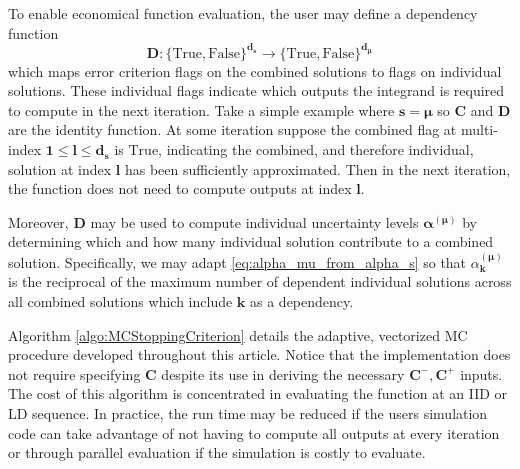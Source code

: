 \documentclass[graybox]{svmult}
\begin{document}
To enable economical function evaluation, the user may define a dependency function
$$\boldsymbol{D}: \{\text{True},\text{False}\}^{\boldsymbol{d}_{\boldsymbol{s}}} \to \{\text{True},\text{False}\}^{\boldsymbol{d}_{\boldsymbol{\mu}}}$$ 
which maps error criterion flags on the combined solutions to flags on individual solutions. These individual flags indicate which outputs the integrand is required to compute in the next iteration. Take a simple example where  $\boldsymbol{s}=\boldsymbol{\mu}$ so $\boldsymbol{C}$ and $\boldsymbol{D}$ are the identity function. At some iteration suppose the combined flag at multi-index $\boldsymbol{1} \leq \boldsymbol{l} \leq \boldsymbol{d}_{\boldsymbol{s}}$ is $\text{True}$, indicating the combined, and therefore individual, solution at index $\boldsymbol{l}$ has been sufficiently approximated. Then in the next iteration, the function does not need to compute outputs at index $\boldsymbol{l}$.

Moreover, $\boldsymbol{D}$ may be used to compute individual uncertainty levels $\boldsymbol{\alpha}^{(\boldsymbol{\mu})}$ by determining which and how many individual solution contribute to a combined solution. Specifically, we may adapt \eqref{eq:alpha_mu_from_alpha_s} so that 
$\alpha_{\boldsymbol{k}}^{(\boldsymbol{\mu})}$ is the reciprocal of the maximum number of dependent individual solutions across all combined solutions which include $\boldsymbol{k}$ as a dependency.

Algorithm \ref{algo:MCStoppingCriterion} details the adaptive, vectorized MC procedure developed throughout this article. Notice that the implementation does not require specifying $\boldsymbol{C}$ despite its use in deriving the necessary $\boldsymbol{C}^-,\boldsymbol{C}^+$ inputs. The cost of this algorithm is concentrated in evaluating the function at an IID or LD sequence. In practice, the run time may be reduced if the users simulation code can take advantage of not having to compute all outputs at every iteration or through parallel evaluation if the simulation is costly to evaluate.
\end{document}
